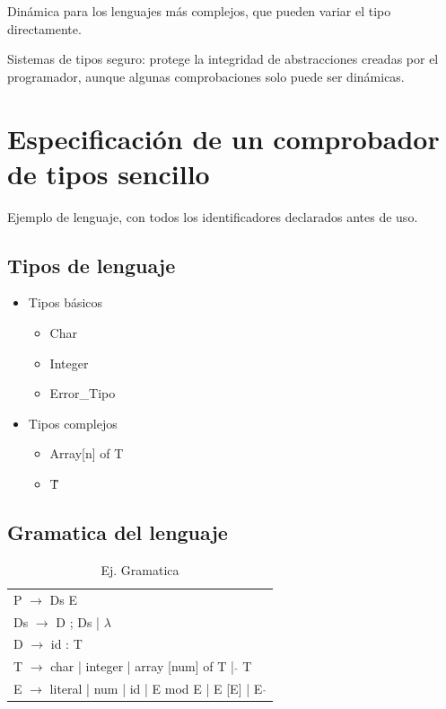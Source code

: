 \documentclass[12pt, twoside, openright]{report} %
\begin{document}
Dinámica para los lenguajes más complejos, que pueden variar el tipo directamente.

Sistemas de tipos seguro: protege la integridad de abstracciones creadas por el programador, aunque algunas comprobaciones solo puede ser dinámicas.

\section{Especificación de un comprobador de tipos sencillo}

Ejemplo de lenguaje, con todos los identificadores declarados antes de uso.

\subsection{Tipos de lenguaje}
\begin{itemize}
  \item Tipos básicos
  \begin{itemize}
    \item Char
    \item Integer
    \item Error\_Tipo
  \end{itemize}
  \item Tipos complejos
  \begin{itemize}
    \item Array[n] of T
    \item \^ T
  \end{itemize}
\end{itemize}

\subsection{Gramatica del lenguaje}

\begin{table}[H]
\begin{tabular}{l}
P $\rightarrow$ Ds E \\
Ds $\rightarrow$ D ; Ds | $\lambda$ \\
D $\rightarrow$ id : T\\
T $\rightarrow$ char | integer | array [num] of T | $\hat{}$ T \\
E $\rightarrow$ literal | num | id | E mod E | E [E] | E $\hat{}$
\end{tabular}
\caption{Ej. Gramatica}
\end{table}
\end{document}
